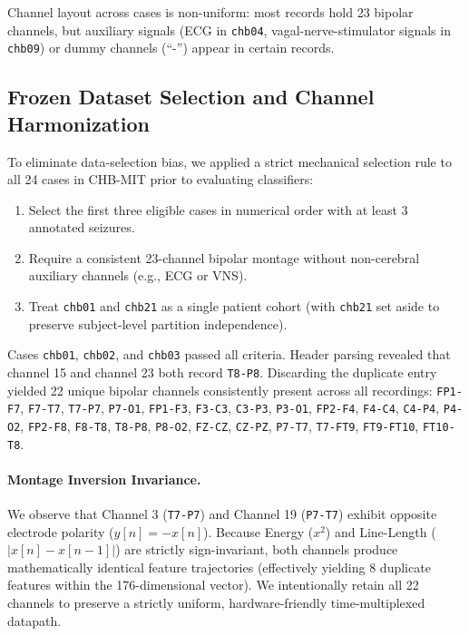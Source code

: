 \documentclass[10pt,twocolumn,letterpaper]{article}
\begin{document}
Channel layout across cases is non-uniform: most records hold 23 bipolar channels, but auxiliary signals (ECG in \texttt{chb04}, vagal-nerve-stimulator signals in \texttt{chb09}) or dummy channels (``-'') appear in certain records.

\subsection{Frozen Dataset Selection and Channel Harmonization}
\label{sec:dataset_selection}

To eliminate data-selection bias, we applied a strict mechanical selection rule to all 24 cases in CHB-MIT prior to evaluating classifiers:
\begin{enumerate}
    \item Select the first three eligible cases in numerical order with at least 3 annotated seizures.
    \item Require a consistent 23-channel bipolar montage without non-cerebral auxiliary channels (e.g., ECG or VNS).
    \item Treat \texttt{chb01} and \texttt{chb21} as a single patient cohort (with \texttt{chb21} set aside to preserve subject-level partition independence).
\end{enumerate}

Cases \texttt{chb01}, \texttt{chb02}, and \texttt{chb03} passed all criteria. Header parsing revealed that channel 15 and channel 23 both record \texttt{T8-P8}. Discarding the duplicate entry yielded 22 unique bipolar channels consistently present across all recordings:
\texttt{FP1-F7}, \texttt{F7-T7}, \texttt{T7-P7}, \texttt{P7-O1}, \texttt{FP1-F3}, \texttt{F3-C3}, \texttt{C3-P3}, \texttt{P3-O1}, \texttt{FP2-F4}, \texttt{F4-C4}, \texttt{C4-P4}, \texttt{P4-O2}, \texttt{FP2-F8}, \texttt{F8-T8}, \texttt{T8-P8}, \texttt{P8-O2}, \texttt{FZ-CZ}, \texttt{CZ-PZ}, \texttt{P7-T7}, \texttt{T7-FT9}, \texttt{FT9-FT10}, \texttt{FT10-T8}.

\paragraph{Montage Inversion Invariance.} We observe that Channel 3 (\texttt{T7-P7}) and Channel 19 (\texttt{P7-T7}) exhibit opposite electrode polarity ($y[n] = -x[n]$). Because Energy ($x^2$) and Line-Length ($|x[n] - x[n-1]|$) are strictly sign-invariant, both channels produce mathematically identical feature trajectories (effectively yielding 8 duplicate features within the 176-dimensional vector). We intentionally retain all 22 channels to preserve a strictly uniform, hardware-friendly time-multiplexed datapath.
\end{document}
